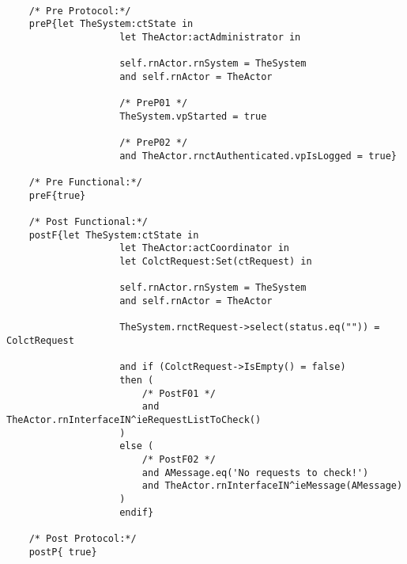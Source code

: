 	\scriptsize
	\vspace{0.5cm}
	\begin{lstlisting}[style=MessirStyle,firstnumber=auto,captionpos=b,caption={\msrmessir (MCL-oriented) specification of the operation \emph{oeGetAllRequests}.},label=OM-actCoordinator-oeGetAllRequests-MCL-LST]

	/* Pre Protocol:*/ 
	preP{let TheSystem:ctState in
					let TheActor:actAdministrator in
					
					self.rnActor.rnSystem = TheSystem
					and self.rnActor = TheActor
					
					/* PreP01 */
					TheSystem.vpStarted = true
					
					/* PreP02 */
					and TheActor.rnctAuthenticated.vpIsLogged = true}
	
	/* Pre Functional:*/
	preF{true}
	
	/* Post Functional:*/ 
	postF{let TheSystem:ctState in
					let TheActor:actCoordinator in
					let ColctRequest:Set(ctRequest) in
					
					self.rnActor.rnSystem = TheSystem
					and self.rnActor = TheActor
					
					TheSystem.rnctRequest->select(status.eq("")) = ColctRequest
					
					and if (ColctRequest->IsEmpty() = false)
					then (
						/* PostF01 */
						and TheActor.rnInterfaceIN^ieRequestListToCheck()
					)
					else (
						/* PostF02 */
						and AMessage.eq('No requests to check!')
						and TheActor.rnInterfaceIN^ieMessage(AMessage)
					)
					endif}
	
	/* Post Protocol:*/ 
	postP{ true}
	
	\end{lstlisting}
	\normalsize 
	
	
	
	





